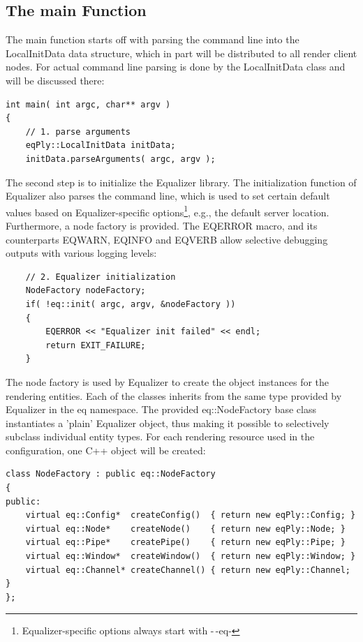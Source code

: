 \documentclass[10pt,a4]{scrartcl}
\begin{document}
\subsection{The main Function}

The main function starts off with parsing the command line into the
\textsf{LocalInitData} data structure, which in part will be distributed
to all render client nodes. For actual command line parsing is done by
the \textsf{LocalInitData} class and will be discussed there:

{\footnotesize\begin{lstlisting}
int main( int argc, char** argv )
{
    // 1. parse arguments
    eqPly::LocalInitData initData;
    initData.parseArguments( argc, argv );
\end{lstlisting}}

The second step is to initialize the Equalizer library. The
initialization function of Equalizer also parses the command line, which
is used to set certain default values based on Equalizer-specific
options\footnote{Equalizer-specific options always start with -\,-eq-},
e.g., the default server location. Furthermore, a node factory is
provided. The \textsf{EQERROR} macro, and its counterparts
\textsf{EQWARN}, \textsf{EQINFO} and \textsf{EQVERB} allow selective
debugging outputs with various logging levels:

{\footnotesize\begin{lstlisting}
    // 2. Equalizer initialization
    NodeFactory nodeFactory;
    if( !eq::init( argc, argv, &nodeFactory ))
    {
        EQERROR << "Equalizer init failed" << endl;
        return EXIT_FAILURE;
    }
\end{lstlisting}}%

The node factory is used by Equalizer to create the object instances for
the rendering entities. Each of the classes inherits from the same type
provided by Equalizer in the \textsf{eq} namespace. The provided
\textsf{eq::NodeFactory} base class instantiates a 'plain' Equalizer
object, thus making it possible to selectively subclass individual
entity types. For each rendering resource used in the configuration, one
C++ object will be created:

{\footnotesize\begin{lstlisting}
class NodeFactory : public eq::NodeFactory
{
public:
    virtual eq::Config*  createConfig()  { return new eqPly::Config; }
    virtual eq::Node*    createNode()    { return new eqPly::Node; }
    virtual eq::Pipe*    createPipe()    { return new eqPly::Pipe; }
    virtual eq::Window*  createWindow()  { return new eqPly::Window; }
    virtual eq::Channel* createChannel() { return new eqPly::Channel; }
};
\end{lstlisting}}
\end{document}
